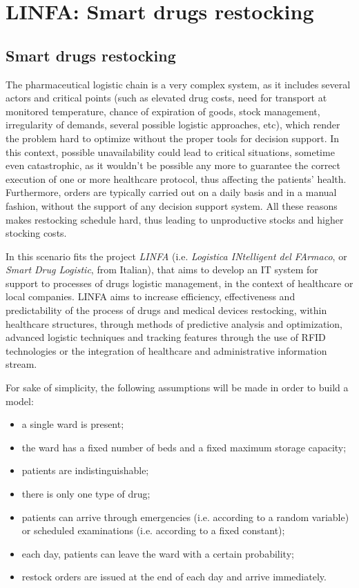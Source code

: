 
\section*{LINFA: Smart drugs restocking}

  \subsection*{Smart drugs restocking}

    The pharmaceutical logistic chain is a very complex system, as it includes several actors and critical points (such as elevated drug costs, need for transport at monitored temperature, chance of expiration of goods, stock management, irregularity of demands, several possible logistic approaches, etc), which render the problem hard to optimize without the proper tools for decision support. In this context, possible unavailability could lead to critical situations, sometime even catastrophic, as it wouldn't be possible any more to guarantee the correct execution of one or more healthcare protocol, thus affecting the patients' health. Furthermore, orders are typically carried out on a daily basis and in a manual fashion, without the support of any decision support system. All these reasons makes restocking schedule hard, thus leading to unproductive stocks and higher stocking costs.
    
    In this scenario fits the project \textit{LINFA} (i.e. \textit{Logistica INtelligent del FArmaco}, or \textit{Smart Drug Logistic}, from Italian), that aims to develop an IT system for support to processes of drugs logistic management, in the context of healthcare or local companies. LINFA aims to increase efficiency, effectiveness and predictability of the process of drugs and medical devices restocking, within healthcare structures, through methods of predictive analysis and optimization, advanced logistic techniques and tracking features through the use of RFID technologies or the integration of healthcare and administrative information stream.
    
    For sake of simplicity, the following assumptions will be made in order to build a model:
    
    \begin{itemize}
      \item a single ward is present;
      \item the ward has a fixed number of beds and a fixed maximum storage capacity;
      \item patients are indistinguishable;
      \item there is only one type of drug;
      \item patients can arrive through emergencies (i.e. according to a random variable) or scheduled examinations (i.e. according to a fixed constant);
      \item each day, patients can leave the ward with a certain probability;
      \item restock orders are issued at the end of each day and arrive immediately.
    \end{itemize}
    
